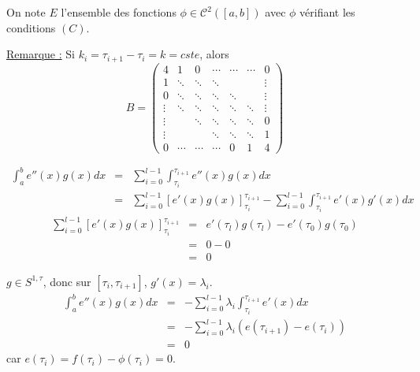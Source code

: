 On note $E$ l'ensemble des fonctions $\phi\in\mathcal{C}^2([a,b])$ avec $\phi$ vérifiant les conditions $(C)$.

\underline{Remarque :} Si $k_i=\tau_{i+1}-\tau_i=k=cste$, alors \[B=\begin{pmatrix} 4 & 1 & 0 & \cdots & \cdots & \cdots & 0 \\ 1 & \ddots & \ddots & \ddots & & & \vdots \\ 0 & \ddots & \ddots & \ddots & \ddots & & \vdots \\ \vdots & \ddots & \ddots & \ddots & \ddots & \ddots & \vdots \\ \vdots &  & \ddots & \ddots & \ddots & \ddots & 0 \\ \vdots & & & \ddots & \ddots & \ddots & 1 \\ 0 & \cdots & \cdots & \cdots & 0 & 1 & 4 \end{pmatrix}\]


\begin{dem}
\begin{eqnarray*}
\int_a^b e''(x)g(x) dx &=&\sum_{i=0}^{l-1} \int_{\tau_i}^{\tau_{i+1}} e''(x)g(x) dx \\
			&=& \sum_{i=0}^{l-1} [e'(x)g(x)]_{\tau_i}^{\tau_{i+1}} - \sum_{i=0}^{l-1} \int_{\tau_i}^{\tau_{i+1}} e'(x)g'(x) dx 
\end{eqnarray*}
\begin{eqnarray*}
\sum_{i=0}^{l-1} [e'(x)g(x)]_{\tau_i}^{\tau_{i+1}}&=&e'(\tau_l)g(\tau_l) - e'(\tau_0)g(\tau_0) \\
						&=& 0-0 \\
						&=& 0
\end{eqnarray*}

$g\in S^{1,\tau}$, donc sur $[\tau_i,\tau_{i+1}]$, $g'(x)=\lambda_i$.
\begin{eqnarray*}
\int_a^b e''(x)g(x) dx &=& -\sum_{i=0}^{l-1} \lambda_i \int_{\tau_i}^{\tau_{i+1}} e'(x) dx \\
			&=& -\sum_{i=0}^{l-1} \lambda_i (e(\tau_{i+1})-e(\tau_i)) \\
			&=& 0
\end{eqnarray*}
car $e(\tau_i)=f(\tau_i)-\phi(\tau_i)=0$. 
\end{dem}

